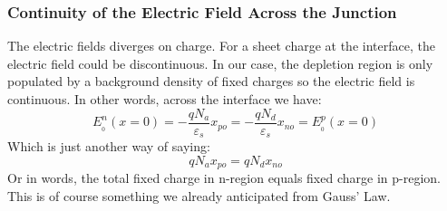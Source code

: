 \subsubsection{Continuity of the Electric Field Across the Junction}
The electric fields diverges on charge. For a sheet charge at the interface, the electric field could be discontinuous.   In our case, the depletion region is only populated by a background density of fixed charges so the electric field is continuous.  In other words, across the interface we have:
    \begin{equation} 
        E_{_0}^n(x = 0) =  - \frac{{q{N_a}}}{{{\varepsilon _s}}}{x_{po}} =  - \frac{{q{N_d}}}{{{\varepsilon _s}}}{x_{no}} = E_{_0}^p(x = 0) 
    \end{equation}
Which is just another way of saying:
    \begin{equation} 
        q{N_a}{x_{po}} = q{N_d}{x_{no}} 
    \end{equation}
Or in words, the total fixed charge in n-region equals fixed charge in p-region.  This is of course something we already anticipated from Gauss' Law.
